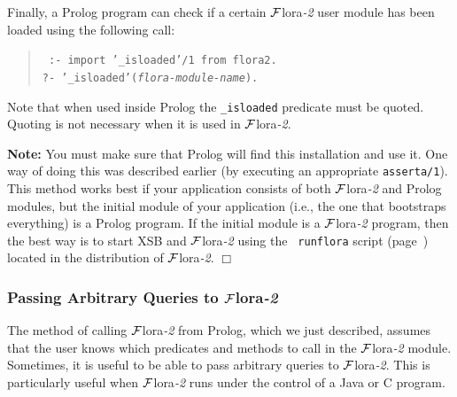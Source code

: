 \documentclass[11pt]{article}
\newcommand{\FLORA}{{\mbox{\sc ${\cal F}${lora}\rm\emph{-2}}}\xspace}
\begin{document}
Finally, a Prolog program can check if a certain \FLORA user module has been
loaded using the following call:
\begin{quote}
 \tt
 :- import '\_isloaded'/1 from flora2.\\
 ?- '\_isloaded'({\it flora-module-name}).
\end{quote}
Note that when used inside Prolog the {\tt \_isloaded} predicate must be
quoted. Quoting is not necessary when it is used in \FLORA. 

\noindent
{\bf Note:} 
You must make sure that Prolog will find this installation and use it.
One way of doing this was described
earlier (by executing an appropriate {\tt asserta/1}). This method works
best if your application consists of both \FLORA and Prolog modules, but
the initial module of your application (i.e., the one that bootstraps
everything) is a Prolog program.  If the initial module is a \FLORA
program, then the best way is to start XSB and \FLORA using the {\tt
  runflora} script (page~\pageref{runflora-page}) located in the
distribution of \FLORA.
\hfill $\Box$

\subsubsection{Passing Arbitrary Queries to \FLORA}

The method of calling \FLORA from Prolog, which we just described, assumes
that the user knows which predicates and methods to call in the \FLORA
module. Sometimes, it is useful to be able to pass arbitrary queries to
\FLORA. This is particularly useful when \FLORA runs under the control of a
Java or C program.
\end{document}
